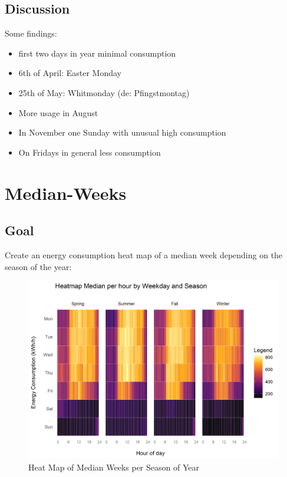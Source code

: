 \documentclass[
  a4paperpaper,
]{book}
\begin{document}
\hypertarget{discussion-5}{%
\subsection{Discussion}\label{discussion-5}}

Some findings:

\begin{itemize}
\item
  first two days in year minimal consumption
\item
  6th of April: Easter Monday
\item
  25th of May: Whitmonday (de: Pfingstmontag)
\item
  More usage in August
\item
  In November one Sunday with unusual high consumption
\item
  On Fridays in general less consumption
\end{itemize}

\newpage

\hypertarget{median-weeks}{%
\section{Median-Weeks}\label{median-weeks}}

\hypertarget{goal-11}{%
\subsection{Goal}\label{goal-11}}

Create an energy consumption heat map of a median week depending on the season of the year:

\begin{figure}
\includegraphics[width=0.7\linewidth]{images/plotHeatMapMedianWeeks} \caption{Heat Map of Median Weeks per Season of Year}\label{fig:unnamed-chunk-20}
\end{figure}
\end{document}

